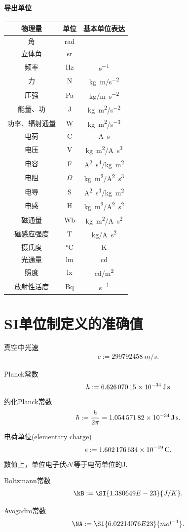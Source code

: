 \paragraph{导出单位}
\begin{center}
	\begin{tabular}{ccc}
		\toprule
		物理量&单位&基本单位表达\\
		\midrule
		角&rad&\\
		立体角&sr&\\
		频率&Hz&\si{s^{-1}}\\
		力&N&\si{kg.m/s^{-2}}\\
		压强&Pa&\si{kg/m.s^{-2}}\\
		能量、功&J&\si{kg.m^2/s^{-2}}\\
		功率、辐射通量&W&\si{kg.m^2/s^{-3}}\\
		电荷&C&\si{A.s}\\
		电压&V&\si{kg.m^2/A.s^3}\\
		电容&F&\si{A^2.s^4/kg.m^2}\\
		电阻&$\Omega$&\si{kg.m^2/A^2.s^3}\\
		电导&S&\si{A^2.s^3/kg.m^2}\\
		电感&H&\si{kg.m^2/A^2.s^2}\\
		磁通量&Wb&\si{kg.m^2/A.s^2}\\
		磁感应强度&T&\si{kg/A.s^2}\\
		摄氏度&$\si{\degreeCelsius}$&K\\
		光通量&lm&cd\\
		照度&lx&\si{cd/m^2}\\
		放射性活度&Bq&\si{s^{-1}}\\
		\bottomrule
	\end{tabular}
\end{center}
\section{SI单位制定义的准确值}
\begin{compactitem}
	\item 真空中光速
		\begin{align}
			c:=\SI{299792458}{m/s}.
		\end{align}
	\item Planck常数
		\begin{align}
			h:=\SI{6.62607015E-34}{J.s}
		\end{align}
		约化Planck常数
		\begin{align}
			\hbar:=\frac{h}{2\pi}=\SI{1.05457182E-34}{J.s}.
		\end{align}
	\item 电荷单位(elementary charge)
		\begin{align}
			e:=\SI{1.602176634E-19}{C}.
		\end{align}
		数值上，单位电子伏eV等于电荷单位的J.
	\item Boltzmann常数
		\begin{align}
			\kB:=\SI{1.380649E-23}{J/K}.
		\end{align}
	\item Avogadro常数
		\begin{align}
			\NA:=\SI{6.02214076E23}{mol^{-1}}.
		\end{align}
\end{compactitem}

